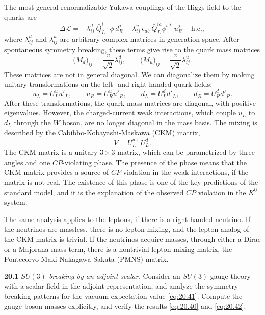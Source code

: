 The most general renormalizable Yukawa couplings of the Higgs field to the
quarks are
\begin{equation}
  \Delta\mathcal{L} = -\lambda^d_{ij}\ \bar{Q}^i_L\cdot\phi\,d^j_R
    - \lambda^u_{ij}\ \epsilon_{ab}\ \bar{Q}^{ia}_L\phi^{b*}\,u^j_R
    + \mathrm{h.c.} ,
  \label{eq:20.133}
\end{equation}
where $\lambda^d_{ij}$ and $\lambda^u_{ij}$ are arbitrary complex matrices in
generation space.  After spontaneous symmetry breaking, these terms give rise
to the quark mass matrices
\begin{equation}
  \bigl( M_d \bigr)_{ij} = \frac{v}{\sqrt{2}}\lambda^d_{ij},\qquad
  \bigl( M_u \bigr)_{ij} = \frac{v}{\sqrt{2}}\lambda^u_{ij} .
\end{equation}
These matrices are not in general diagonal.  We can diagonalize them by
making unitary transformations on the left- and right-handed quark fields:
\begin{equation}
  u_L = U^u_L u'_L,\qquad u_R = U^u_R u'_R,\qquad
  d_L = U^d_L d'_L,\qquad d_R = U^d_R d'_R .
  \label{eq:20.134}
\end{equation}
After these transformations, the quark mass matrices are diagonal, with
positive eigenvalues.  However, the charged-current weak interactions, which
couple $u_L$ to $d_L$ through the $W$ boson, are no longer diagonal in the
mass basis.  The mixing is described by the Cabibbo-Kobayashi-Maskawa (CKM)
matrix,
\begin{equation}
  V = U^{u\dagger}_L U^d_L .
  \label{eq:20.135}
\end{equation}
The CKM matrix is a unitary $3\times3$ matrix, which can be parametrized by
three angles and one $CP$-violating phase.  The presence of the phase means
that the CKM matrix provides a source of $CP$ violation in the weak
interactions, if the matrix is not real.  The existence of this phase is one
of the key predictions of the standard model, and it is the explanation of
the observed $CP$ violation in the $K^0$ system.

The same analysis applies to the leptons, if there is a right-handed
neutrino.  If the neutrinos are massless, there is no lepton mixing, and the
lepton analog of the CKM matrix is trivial.  If the neutrinos acquire
masses, through either a Dirac or a Majorana mass term, there is a
nontrivial lepton mixing matrix, the Pontecorvo-Maki-Nakagawa-Sakata (PMNS)
matrix.

\problems

\textbf{20.1} \emph{$SU(3)$ breaking by an adjoint scalar.}  Consider an
$SU(3)$ gauge theory with a scalar field in the adjoint representation, and
analyze the symmetry-breaking patterns for the vacuum expectation value
\eqref{eq:20.41}.  Compute the gauge boson masses explicitly, and verify the
results \eqref{eq:20.40} and \eqref{eq:20.42}.

